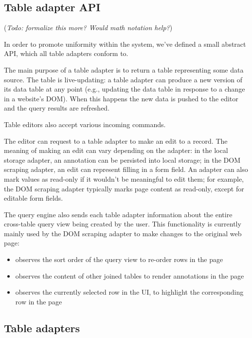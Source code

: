 \documentclass[sigplan,10pt,anonymous,review]{acmart}
\providecommand{\tightlist}{%
  \setlength{\itemsep}{0pt}\setlength{\parskip}{0pt}}
\begin{document}
\hypertarget{table-adapter-api}{%
\subsection{Table adapter API}\label{table-adapter-api}}

(\emph{Todo: formalize this more? Would math notation help?})

In order to promote uniformity within the system, we've defined a small
abstract API, which all table adapters conform to.

The main purpose of a table adapter is to return a table representing
some data source. The table is live-updating: a table adapter can
produce a new version of its data table at any point (e.g., updating the
data table in response to a change in a website's DOM). When this
happens the new data is pushed to the editor and the query results are
refreshed.

Table editors also accept various incoming commands.

The editor can request to a table adapter to make an edit to a record.
The meaning of making an edit can vary depending on the adapter: in the
local storage adapter, an annotation can be persisted into local
storage; in the DOM scraping adapter, an edit can represent filling in a
form field. An adapter can also mark values as read-only if it wouldn't
be meaningful to edit them; for example, the DOM scraping adapter
typically marks page content as read-only, except for editable form
fields.

The query engine also sends each table adapter information about the
entire cross-table query view being created by the user. This
functionality is currently mainly used by the DOM scraping adapter to
make changes to the original web page:

\begin{itemize}
\tightlist
\item
  observes the sort order of the query view to re-order rows in the page
\item
  observes the content of other joined tables to render annotations in
  the page
\item
  observes the currently selected row in the UI, to highlight the
  corresponding row in the page
\end{itemize}

\hypertarget{table-adapters}{%
\subsection{Table adapters}\label{table-adapters}}
\end{document}

